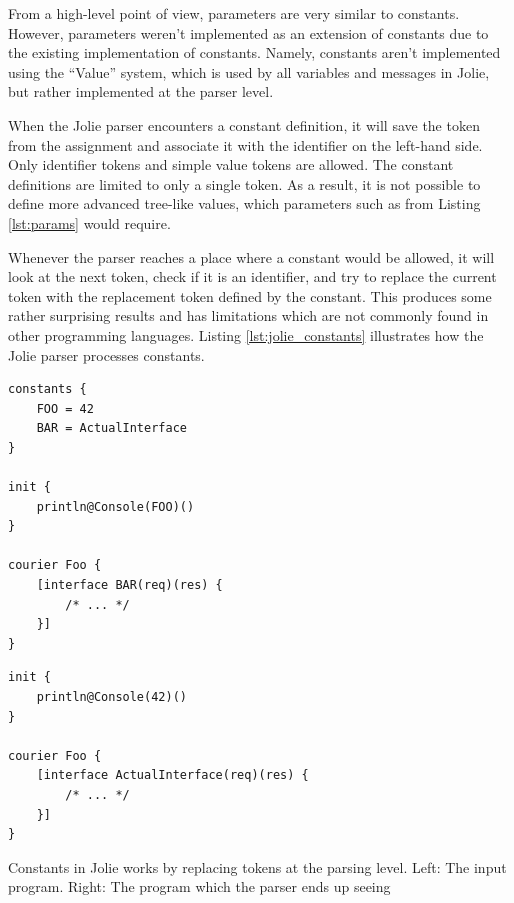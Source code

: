 From a high-level point of view, parameters are very similar to constants.
However, parameters weren't implemented as an extension of constants due to the
existing implementation of constants. Namely, constants aren't implemented
using the ``Value'' system, which is used by all variables and messages in
Jolie, but rather implemented at the parser level.

When the Jolie parser encounters a constant definition, it will save the token
from the assignment and associate it with the identifier on the left-hand side.
Only identifier tokens and simple value tokens are allowed. The constant
definitions are limited to only a single token. As a result, it is not possible
to define more advanced tree-like values, which parameters such as
 from Listing \ref{lst:params} would require.

Whenever the parser reaches a place where a constant would be allowed, it will
look at the next token, check if it is an identifier, and try to replace the
current token with the replacement token defined by the constant. This produces
some rather surprising results and has limitations which are not commonly found
in other programming languages.  Listing \ref{lst:jolie_constants} illustrates
how the Jolie parser processes constants.

\begin{listing}[H]
\begin{multicols}{2}

\begin{verbatim}
constants {
    FOO = 42
    BAR = ActualInterface
}

init {
    println@Console(FOO)()
}

courier Foo {
    [interface BAR(req)(res) {
        /* ... */
    }]
}
\end{verbatim}

\columnbreak

\begin{verbatim}
init {
    println@Console(42)()
}

courier Foo {
    [interface ActualInterface(req)(res) {
        /* ... */
    }]
}
\end{verbatim}

\end{multicols}

\caption{Constants in Jolie works by replacing tokens at the parsing level.
    Left: The input program. Right: The program which the parser ends up
        seeing}

\label{lst:jolie_constants}

\end{listing}


